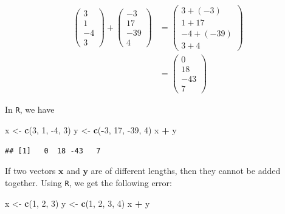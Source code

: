 \documentclass[
]{book}
\newenvironment{Shaded}{\begin{snugshade}}{\end{snugshade}}
\newcommand{\DecValTok}[1]{\textcolor[rgb]{0.00,0.00,0.81}{#1}}
\newcommand{\KeywordTok}[1]{\textcolor[rgb]{0.13,0.29,0.53}{\textbf{#1}}}
\newcommand{\NormalTok}[1]{#1}
\newcommand{\OperatorTok}[1]{\textcolor[rgb]{0.81,0.36,0.00}{\textbf{#1}}}
\newcommand{\StringTok}[1]{\textcolor[rgb]{0.31,0.60,0.02}{#1}}
\theoremstyle{definition}
\theoremstyle{definition}
\theoremstyle{definition}
\theoremstyle{definition}
\theoremstyle{remark}
\begin{document}
\[
\begin{aligned}
\begin{pmatrix} 3 \\ 1 \\ -4 \\ 3 \end{pmatrix} + \begin{pmatrix} -3 \\ 17 \\ -39 \\ 4 \end{pmatrix} & = \begin{pmatrix} 3 + (-3) \\ 1 + 17 \\ -4 + (-39) \\ 3 + 4 \end{pmatrix} \\
& = \begin{pmatrix} 0 \\ 18 \\ -43 \\ 7 \end{pmatrix} 
\end{aligned}
\]

In \texttt{R}, we have

\begin{Shaded}
\begin{Highlighting}[]
\NormalTok{x <-}\StringTok{ }\KeywordTok{c}\NormalTok{(}\DecValTok{3}\NormalTok{, }\DecValTok{1}\NormalTok{, }\DecValTok{-4}\NormalTok{, }\DecValTok{3}\NormalTok{)}
\NormalTok{y <-}\StringTok{ }\KeywordTok{c}\NormalTok{(}\OperatorTok{-}\DecValTok{3}\NormalTok{, }\DecValTok{17}\NormalTok{, }\DecValTok{-39}\NormalTok{, }\DecValTok{4}\NormalTok{)}
\NormalTok{x }\OperatorTok{+}\StringTok{ }\NormalTok{y}
\end{Highlighting}
\end{Shaded}

\begin{verbatim}
## [1]   0  18 -43   7
\end{verbatim}

If two vectors \(\mathbf{x}\) and \(\mathbf{y}\) are of different lengths, then they cannot be added together. Using \texttt{R}, we get the following error:

\begin{Shaded}
\begin{Highlighting}[]
\NormalTok{x <-}\StringTok{ }\KeywordTok{c}\NormalTok{(}\DecValTok{1}\NormalTok{, }\DecValTok{2}\NormalTok{, }\DecValTok{3}\NormalTok{)}
\NormalTok{y <-}\StringTok{ }\KeywordTok{c}\NormalTok{(}\DecValTok{1}\NormalTok{, }\DecValTok{2}\NormalTok{, }\DecValTok{3}\NormalTok{, }\DecValTok{4}\NormalTok{)}
\NormalTok{x }\OperatorTok{+}\StringTok{ }\NormalTok{y}
\end{Highlighting}
\end{Shaded}
\end{document}
